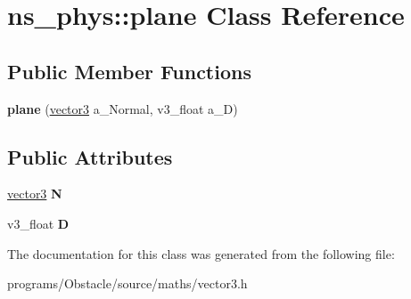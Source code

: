 \hypertarget{classns__phys_1_1plane}{}\section{ns\+\_\+phys\+:\+:plane Class Reference}
\label{classns__phys_1_1plane}
\subsection*{Public Member Functions}
\begin{DoxyCompactItemize}
\item 
{\bfseries plane} (\hyperlink{classns__phys_1_1vector3}{vector3} a\+\_\+\+Normal, v3\+\_\+float a\+\_\+D)\hypertarget{classns__phys_1_1plane_ae2b312cf6a4d49c435dc5d826b116368}{}\label{classns__phys_1_1plane_ae2b312cf6a4d49c435dc5d826b116368}

\end{DoxyCompactItemize}
\subsection*{Public Attributes}
\begin{DoxyCompactItemize}
\item 
\hyperlink{classns__phys_1_1vector3}{vector3} {\bfseries N}\hypertarget{classns__phys_1_1plane_a30ffe33e9a9a3bf99d8ee2f24e0e4c46}{}\label{classns__phys_1_1plane_a30ffe33e9a9a3bf99d8ee2f24e0e4c46}

\item 
v3\+\_\+float {\bfseries D}\hypertarget{classns__phys_1_1plane_a087ff2694fde67e22c5fb1570b936e73}{}\label{classns__phys_1_1plane_a087ff2694fde67e22c5fb1570b936e73}

\end{DoxyCompactItemize}


The documentation for this class was generated from the following file\+:\begin{DoxyCompactItemize}
\item 
programs/\+Obstacle/source/maths/vector3.\+h\end{DoxyCompactItemize}
